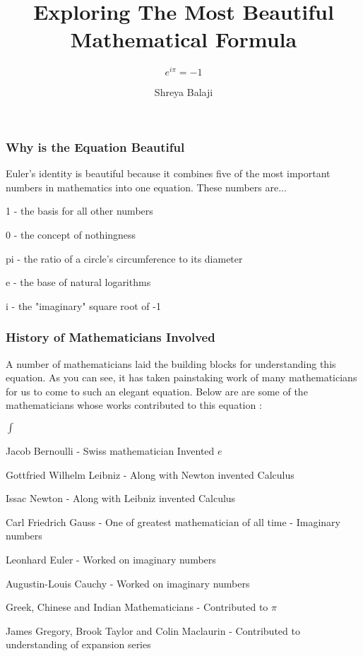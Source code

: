 \documentclass[10pt]{beamer}
\begin{document}
\author{Shreya Balaji}
\title{Exploring The Most Beautiful Mathematical Formula}
\subtitle{\huge\(e^{i \pi} = -1\)}


\begin{frame}[plain]
	\maketitle
\end{frame}

\begin{frame}
	\frametitle{Why is the Equation Beautiful}
	
	Euler's identity is beautiful because it combines five of the most important numbers in mathematics into one equation. These numbers are...
	
	\item 1 - the basis for all other numbers
	\item 0 - the concept of nothingness
	\item pi - the ratio of a circle's circumference to its diameter
	\item e - the base of natural logarithms
	\item i - the "imaginary" square root of -1
	
\end{frame}

\begin{frame}
	\frametitle{ History of Mathematicians Involved}

	A number of mathematicians laid the building blocks for understanding this equation.  As you can see, it has taken painstaking work of many mathematicians for us to come to such an elegant equation. Below are are some of the mathematicians whose works contributed to this equation :
	\vspace{7pt}

	\begin{list}{$\int$}{}
		\item Jacob Bernoulli - Swiss mathematician Invented $e$
		\item  Gottfried Wilhelm Leibniz  - Along with Newton invented Calculus
		\item Issac Newton - Along with Leibniz invented Calculus
		\item Carl Friedrich Gauss - One of  greatest mathematician of all time - Imaginary numbers
		\item Leonhard Euler - Worked on imaginary numbers
		\item Augustin-Louis Cauchy - Worked on imaginary numbers
		\item Greek, Chinese and Indian Mathematicians - Contributed to $\pi$
		\item James Gregory, Brook Taylor and Colin Maclaurin - Contributed to understanding of expansion series
	\end{list}

\end{frame}
\end{document}
